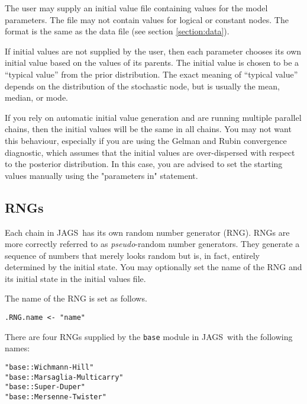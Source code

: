 \documentclass[11pt, a4paper, titlepage]{report}
\newcommand{\JAGS}{\textsf{JAGS}}
\begin{document}
The user may supply an initial value file containing values for the
model parameters. The file may not contain values for logical or
constant nodes. The format is the same as the data file (see section
\ref{section:data}).

If initial values are not supplied by the user, then each parameter
chooses its own initial value based on the values of its parents.  The
initial value is chosen to be a ``typical value'' from the prior
distribution. The exact meaning of ``typical value'' depends on the
distribution of the stochastic node, but is usually the mean, median,
or mode.

If you rely on automatic initial value generation and are running
multiple parallel chains, then the initial values will be the same in
all chains.  You may not want this behaviour, especially if you are
using the Gelman and Rubin convergence diagnostic, which assumes that
the initial values are over-dispersed with respect to the posterior
distribution. In this case, you are advised to set the starting values
manually using the "parameters in" statement.

\subsection{RNGs}
\label{section:rngs}

Each chain in \JAGS\ has its own random number generator (RNG). RNGs
are more correctly referred to as {\em pseudo}-random number
generators. They generate a sequence of numbers that merely looks
random but is, in fact, entirely determined by the initial state.  You
may optionally set the name of the RNG and its initial state in the
initial values file.

The name of the RNG is set as follows. 
\begin{verbatim}
.RNG.name <- "name"
\end{verbatim}
There are four RNGs supplied by the \texttt{base} module in \JAGS\
with the following names:
\begin{verbatim}
"base::Wichmann-Hill"
"base::Marsaglia-Multicarry"
"base::Super-Duper"
"base::Mersenne-Twister"
\end{verbatim}
\end{document}
